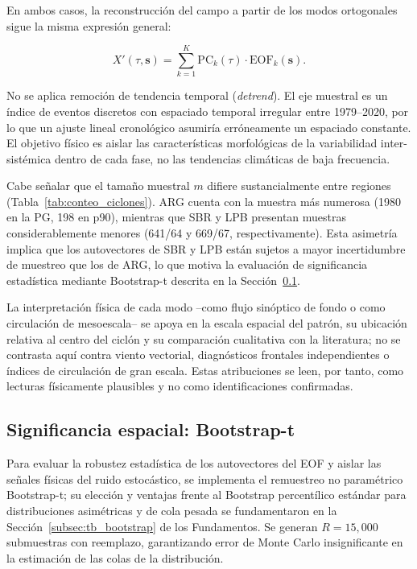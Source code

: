 En ambos casos, la reconstrucción del campo a partir de los modos ortogonales sigue la misma expresión general:

\begin{equation}\label{eq:eof_reconstruccion}
    X'(\tau, \mathbf{s}) = \sum_{k=1}^{K} \text{PC}_k(\tau) \cdot \text{EOF}_k(\mathbf{s}).
\end{equation}

No se aplica remoción de tendencia temporal (\textit{detrend}). El eje muestral es un índice de eventos discretos con espaciado temporal irregular entre 1979--2020, por lo que un ajuste lineal cronológico asumiría erróneamente un espaciado constante. El objetivo físico es aislar las características morfológicas de la variabilidad inter-sistémica dentro de cada fase, no las tendencias climáticas de baja frecuencia.

Cabe señalar que el tamaño muestral $m$ difiere sustancialmente entre regiones (Tabla~\ref{tab:conteo_ciclones}). ARG cuenta con la muestra más numerosa (1980 en la PG, 198 en p90), mientras que SBR y LPB presentan muestras considerablemente menores (641/64 y 669/67, respectivamente). Esta asimetría implica que los autovectores de SBR y LPB están sujetos a mayor incertidumbre de muestreo que los de ARG, lo que motiva la evaluación de significancia estadística mediante Bootstrap-t descrita en la Sección~\ref{subsec:bootstrap_significancia}.

La interpretación física de cada modo --como flujo sinóptico de fondo o como circulación de mesoescala-- se apoya en la escala espacial del patrón, su ubicación relativa al centro del ciclón y su comparación cualitativa con la literatura; no se contrasta aquí contra viento vectorial, diagnósticos frontales independientes o índices de circulación de gran escala. Estas atribuciones se leen, por tanto, como lecturas físicamente plausibles y no como identificaciones confirmadas.

\subsection{Significancia espacial: Bootstrap-t}\label{subsec:bootstrap_significancia}

Para evaluar la robustez estadística de los autovectores del EOF y aislar las señales físicas del ruido estocástico, se implementa el remuestreo no paramétrico Bootstrap-t; su elección y ventajas frente al Bootstrap percentílico estándar para distribuciones asimétricas y de cola pesada se fundamentaron en la Sección~\ref{subsec:tb_bootstrap} de los Fundamentos. Se generan $R = 15{,}000$ submuestras con reemplazo, garantizando error de Monte Carlo insignificante en la estimación de las colas de la distribución.

